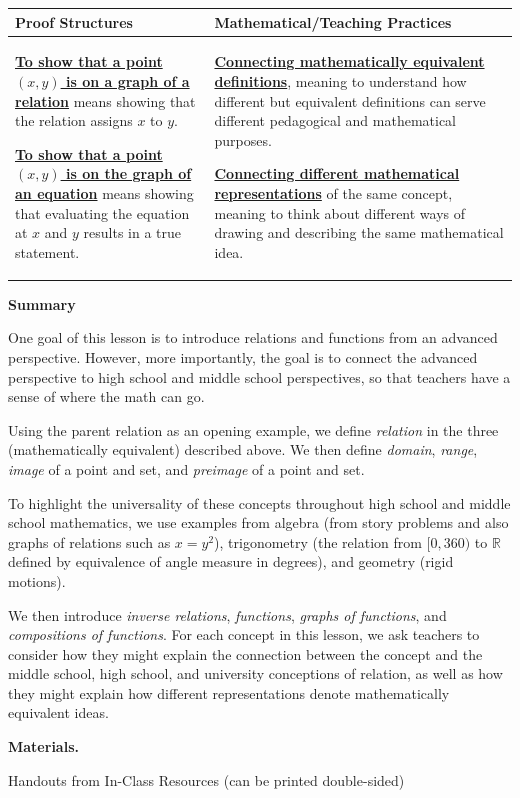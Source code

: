 \documentclass[11pt]{article}
\newcommand\header[1]{\vspace*{4pt}\par {\large {\bf #1}}\par}
\newenvironment{bignote}[1][Instructor note]%
	{\begin{mdframed}\raggedright{\bf #1.~}}
	{\end{mdframed}}
\newcommand{\R}{\mathbb{R}}
\renewcommand\emph[1]{\underline{\bf{#1}}} %
\theoremstyle{definition}
\begin{document}
\begin{tabular}{L{3.2in}|L{3.2in}}
{\bf Proof Structures} & {\bf Mathematical/Teaching Practices} \\ 
\hline \parskip4pt
\emph{To show that a point $(x,y)$ is on a graph of a relation} means showing that the relation assigns $x$ to $y$.

\emph{To show that a point $(x,y)$ is on the graph of an equation} means showing that evaluating the equation at $x$ and $y$ results in a true statement.
&
\parskip6pt
\emph{Connecting mathematically equivalent definitions}, meaning to understand how different but equivalent definitions can serve different pedagogical and mathematical purposes. 

\emph{Connecting different mathematical representations} of the same concept, meaning to think about different ways of drawing and describing the same mathematical idea. 
\end{tabular}

\header{Summary}

One goal of this lesson is to introduce relations and functions from an advanced perspective. However, more importantly, the goal is to connect the advanced perspective to high school and middle school perspectives, so that teachers have a sense of where the math can go.

Using the parent relation as an opening example, we define {\it relation} in the three (mathematically equivalent) described above. We then define {\it domain}, {\it range}, {\it image} of a point and set, and {\it preimage} of a point and set. 

To highlight the universality of these concepts throughout high school and middle school mathematics, we use examples from algebra (from story problems and also graphs of relations such as $x=y^2$), trigonometry (the relation from $[0,360)$ to $\R$ defined by equivalence of angle measure in degrees), and geometry (rigid motions).

We then introduce {\it inverse relations}, {\it functions}, {\it graphs of functions}, and {\it compositions of functions}.  For each concept in this lesson, we ask teachers to consider how they might explain the connection between the concept and the middle school, high school, and university conceptions of relation, as well as how they might explain how different representations denote mathematically equivalent ideas.

\newpage
\begin{bignote}[Materials]
\begin{itemize*}
\item Handouts from In-Class Resources (can be printed double-sided)
\end{itemize*}
\end{bignote}
\end{document}
